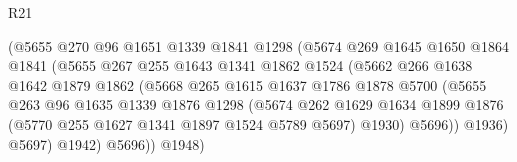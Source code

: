 \begin{lexlean}{R21}
\begin{coremodule}
                                  (@5655
                                    @270
                                    @96
                                    @1651
                                    @1339
                                    @1841
                                    @1298
                                    (@5674
                                      @269
                                      @1645
                                      @1650
                                      @1864
                                      @1841
                                      (@5655
                                        @267
                                        @255
                                        @1643
                                        @1341
                                        @1862
                                        @1524
                                        (@5662
                                          @266
                                          @1638
                                          @1642
                                          @1879
                                          @1862
                                          (@5668
                                            @265
                                            @1615
                                            @1637
                                            @1786
                                            @1878
                                            @5700
                                            (@5655
                                              @263
                                              @96
                                              @1635
                                              @1339
                                              @1876
                                              @1298
                                              (@5674
                                                @262
                                                @1629
                                                @1634
                                                @1899
                                                @1876
                                                (@5770 @255 @1627 @1341 @1897 @1524 @5789 @5697)
                                                @1930)
                                              @5696))
                                          @1936)
                                        @5697)
                                      @1942)
                                    @5696))
                                @1948)

\end{coremodule}
\end{lexlean}
